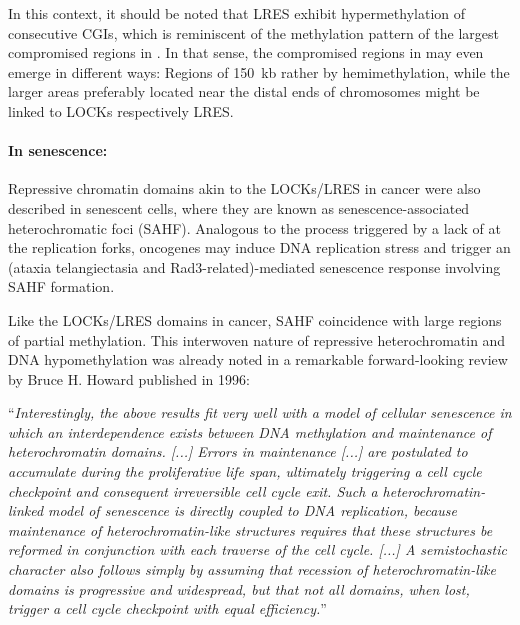 In this context, it should be noted that LRES exhibit hypermethylation of consecutive CGIs\cite{Clark2007}, which is reminiscent of the methylation pattern of the largest compromised regions in \dnmtchip \supple. In that sense, the compromised regions in \dnmtchip may even emerge in different ways: Regions of \SI{150}{\kilo b} rather by hemimethylation, while the larger areas preferably located near the distal ends of chromosomes might be linked to LOCKs respectively LRES.  

\paragraph{In senescence:} Repressive chromatin domains akin to the LOCKs/LRES in cancer were also described in senescent cells, where they are known as senescence-associated heterochromatic foci (SAHF)\cite{Narita2003}. Analogous to the process triggered by a lack of  at the replication forks, oncogenes may induce DNA replication stress and trigger an  (ataxia telangiectasia and Rad3-related)-mediated senescence response involving SAHF formation\cite{Bartkova2006}. 

Like the LOCKs/LRES domains in cancer, SAHF coincidence with large regions of partial methylation\cite{Cruickshanks2013}. This interwoven nature of repressive heterochromatin and DNA hypomethylation was already noted in a remarkable forward-looking review by Bruce H. Howard published in 1996:

\begin{displayquote}
	\enquote{\emph{Interestingly, the above results fit very well with a model of cellular senescence in which an interdependence exists between DNA methylation and maintenance of heterochromatin domains.
			[...] Errors in maintenance [...] are postulated to accumulate during the proliferative life span, ultimately triggering a cell cycle checkpoint and consequent irreversible cell cycle exit. Such a heterochromatin-linked model of senescence is directly coupled to DNA replication, because maintenance of heterochromatin-like structures requires that these structures be reformed in conjunction with each traverse of the cell cycle. [...] A semistochastic character also follows simply by assuming that recession of heterochromatin-like domains is progressive and widespread, but that not all domains, when lost, trigger a cell cycle checkpoint with equal efficiency.}}\cite{Howard1996}
\end{displayquote}

